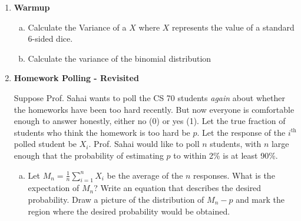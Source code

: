\documentclass[11pt]{article}
\begin{document}
\maketitle


%
%
%

\begin{enumerate}

\item {\bf Warmup}
\begin{enumerate}[a)]
\item Calculate the Variance of a $X$ where $X$ represents the value of a standard 6-sided dice.
\item Calculate the variance of the binomial distribution
\end{enumerate}

\vspace{20mm}

\item {\bf Homework Polling - Revisited} 

Suppose Prof. Sahai wants to poll the CS 70 students {\em again} about whether the homeworks have been too hard recently.  But now everyone is comfortable enough to answer honestly, either no (0) or yes (1). Let the true fraction of students who think the homework is too hard be $p$. Let the response of the $i^{\text{th}}$ polled student be $X_i$.  Prof. Sahai would like to poll $n$ students, with $n$ large enough that the probability of estimating $p$ to within 2\% is at least 90\%.

\begin{enumerate}[a)]

\item Let $M_n = \frac{1}{n}\sum_{i=1}^n X_i$ be the average of the $n$ responses. What is the expectation of $M_n$? Write an equation that describes the desired probability. Draw a picture of the distribution of $M_n - p$ and mark the region where the desired probability would be obtained.

\vspace{20mm}

\end{enumerate}


\end{enumerate}
\end{document}
